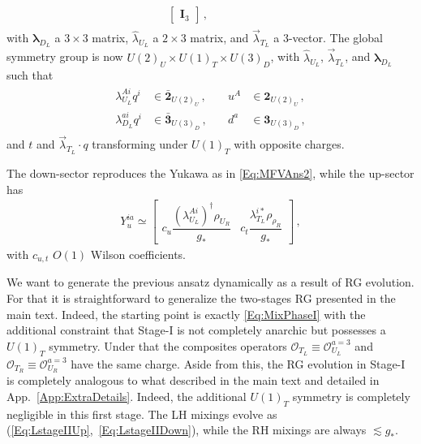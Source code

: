 \documentclass[aps,prl,twocolumn,showpacs,10pt,preprintnumbers,nofootinbib]{revtex4-2}
\newcommand{\gst}{g_*}
\newcommand{\op}{\mathcal{O}}
\begin{document}
{\begin{align}
\begin{aligned}
\begin{bmatrix}
    \mathbf{I}_3
\end{bmatrix}\,, \quad \quad\quad \quad
\end{aligned}
\end{align}
with $\boldsymbol{\lambda}_{D_L}$ a $3 \times 3$ matrix, $\hat{\lambda}_{U_L}$ a $2 \times 3$ matrix, and $\vec{\lambda}_{T_L}$ a 3-vector. The global symmetry group is now $U(2)_U\times U(1)_T\times U(3)_D$, with $\hat{\lambda}_{U_L}$, $\vec{\lambda}_{T_L}$, and $\boldsymbol{\lambda}_{D_L}$ such that
\begin{align}
\begin{aligned}
    \lambda_{U_L}^{Ai}q^{i} &\in \bar{\mathbf{2}}_{U(2)_U}\,, &\quad u^A &\in \mathbf{2}_{U(2)_U}\,,\\ 
    \lambda_{D_L}^{ai}q^{i} &\in \bar{\mathbf{3}}_{U(3)_D}\,, &\quad d^a &\in \mathbf{3}_{U(3)_D}\,,
\end{aligned}
\end{align}
and $t$ and $\vec{\lambda}_{T_L} \cdot q$ transforming under $U(1)_T$ with opposite charges.

The down-sector reproduces the Yukawa as in \eqref{Eq:MFVAns2}, while the up-sector has
\begin{align}
   Y_u^{ia} \simeq \left[ \begin{array}{cc}
   c_u\dfrac{(\lambda_{U_L}^{Ai})^{\dagger}\rho_{U_R}}{\gst}&c_t\dfrac{\lambda_{T_L}^{i*}\rho_{\rho_R}}{\gst}\end{array} \right]\,,
\end{align}
with $c_{u,t}$ $O(1)$ Wilson coefficients.

We want to generate the previous ansatz dynamically as a result of RG evolution. For that it is straightforward to generalize the two-stages RG presented in the main text. Indeed, the starting point is exactly \eqref{Eq:MixPhaseI} with the additional constraint that  Stage-I is not completely anarchic but possesses a $U(1)_T$ symmetry. Under that the composites operators $\op_{T_L}\equiv \op_{U_L}^{a=3}$ and $\op_{T_R}\equiv \op_{U_R}^{a=3}$ have the same charge.  Aside from this, the RG evolution in Stage-I is completely analogous to what described in the main text and detailed in App.~\ref{App:ExtraDetails}. Indeed, the additional $U(1)_T$ symmetry is completely negligible in this first stage. The LH mixings evolve as (\ref{Eq:LstageIIUp},~\ref{Eq:LstageIIDown}), while the RH mixings are always $\lesssim \gst$.

}
\end{document}
